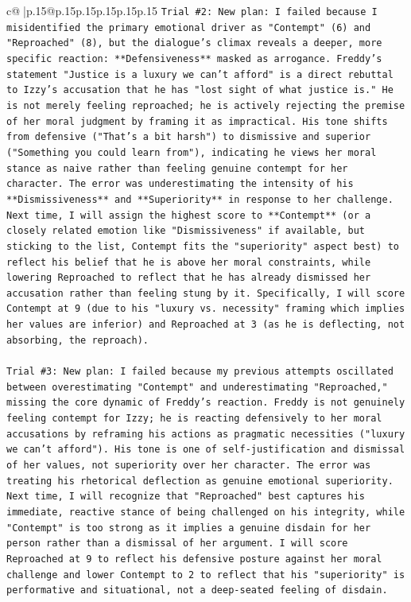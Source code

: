 \documentclass{article}
\begin{document}
{\begin{supertabular}{c@{$\;$}|p{.15\linewidth}@{}p{.15\linewidth}p{.15\linewidth}p{.15\linewidth}p{.15\linewidth}p{.15\linewidth}}
{{{\texttt{Trial \#2: New plan: I failed because I misidentified the primary emotional driver as "Contempt" (6) and "Reproached" (8), but the dialogue's climax reveals a deeper, more specific reaction: **Defensiveness** masked as arrogance. Freddy's statement "Justice is a luxury we can't afford" is a direct rebuttal to Izzy's accusation that he has "lost sight of what justice is." He is not merely feeling reproached; he is actively rejecting the premise of her moral judgment by framing it as impractical. His tone shifts from defensive ("That's a bit harsh") to dismissive and superior ("Something you could learn from"), indicating he views her moral stance as naive rather than feeling genuine contempt for her character. The error was underestimating the intensity of his **Dismissiveness** and **Superiority** in response to her challenge. Next time, I will assign the highest score to **Contempt** (or a closely related emotion like "Dismissiveness" if available, but sticking to the list, Contempt fits the "superiority" aspect best) to reflect his belief that he is above her moral constraints, while lowering Reproached to reflect that he has already dismissed her accusation rather than feeling stung by it. Specifically, I will score Contempt at 9 (due to his "luxury vs. necessity" framing which implies her values are inferior) and Reproached at 3 (as he is deflecting, not absorbing, the reproach).} \\
\\ 
\texttt{Trial \#3: New plan: I failed because my previous attempts oscillated between overestimating "Contempt" and underestimating "Reproached," missing the core dynamic of Freddy's reaction. Freddy is not genuinely feeling contempt for Izzy; he is reacting defensively to her moral accusations by reframing his actions as pragmatic necessities ("luxury we can't afford"). His tone is one of self{-}justification and dismissal of her values, not superiority over her character. The error was treating his rhetorical deflection as genuine emotional superiority. Next time, I will recognize that "Reproached" best captures his immediate, reactive stance of being challenged on his integrity, while "Contempt" is too strong as it implies a genuine disdain for her person rather than a dismissal of her argument. I will score Reproached at 9 to reflect his defensive posture against her moral challenge and lower Contempt to 2 to reflect that his "superiority" is performative and situational, not a deep{-}seated feeling of disdain.} \\
\\ 
}}}
\end{supertabular}}
\end{document}
